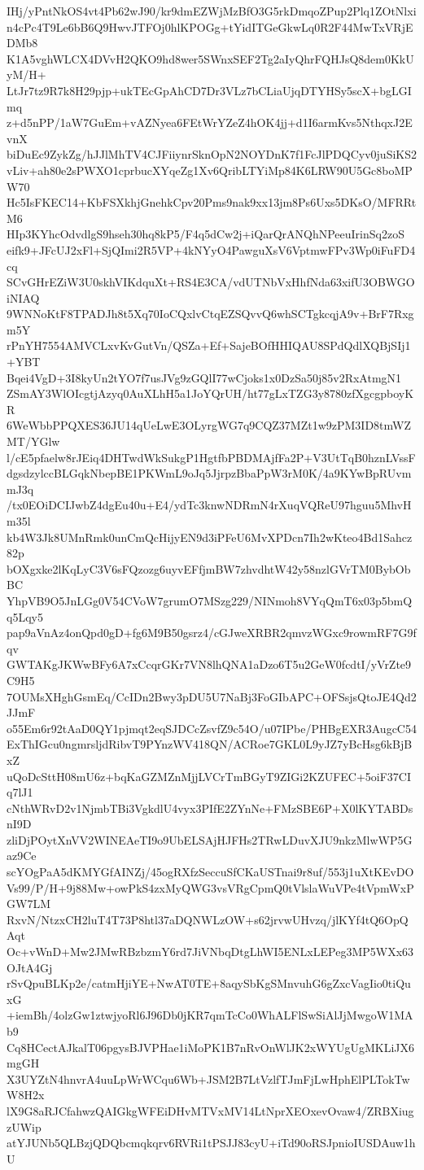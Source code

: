 IHj/yPntNkOS4vt4Pb62wJ90/kr9dmEZWjMzBfO3G5rkDmqoZPup2Plq1ZOtNlxi
n4cPc4T9Le6bB6Q9HwvJTFOj0hlKPOGg+tYidITGeGkwLq0R2F44MwTxVRjEDMb8
K1A5vghWLCX4DVvH2QKO9hd8wer5SWnxSEF2Tg2aIyQhrFQHJsQ8dem0KkUyM/H+
LtJr7tz9R7k8H29pjp+ukTEcGpAhCD7Dr3VLz7bCLiaUjqDTYHSy5scX+bgLGImq
z+d5nPP/1aW7GuEm+vAZNyea6FEtWrYZeZ4hOK4jj+d1I6armKvs5NthqxJ2EvnX
biDuEc9ZykZg/hJJlMhTV4CJFiiynrSknOpN2NOYDnK7f1FcJlPDQCyv0juSiKS2
vLiv+ah80e2sPWXO1cprbucXYqeZg1Xv6QribLTYiMp84K6LRW90U5Gc8boMPW70
Hc5IsFKEC14+KbFSXkhjGnehkCpv20Pms9nak9xx13jm8Ps6Uxs5DKsO/MFRRtM6
HIp3KYhcOdvdlgS9hseh30hq8kP5/F4q5dCw2j+iQarQrANQhNPeeuIrinSq2zoS
eifk9+JFcUJ2xFl+SjQImi2R5VP+4kNYyO4PawguXsV6VptmwFPv3Wp0iFuFD4cq
SCvGHrEZiW3U0skhVIKdquXt+RS4E3CA/vdUTNbVxHhfNda63xifU3OBWGOiNIAQ
9WNNoKtF8TPADJh8t5Xq70IoCQxlvCtqEZSQvvQ6whSCTgkcqjA9v+BrF7Rxgm5Y
rPnYH7554AMVCLxvKvGutVn/QSZa+Ef+SajeBOfHHIQAU8SPdQdlXQBjSIj1+YBT
Bqei4VgD+3I8kyUn2tYO7f7usJVg9zGQlI77wCjoks1x0DzSa50j85v2RxAtmgN1
ZSmAY3WlOIcgtjAzyq0AuXLhH5a1JoYQrUH/ht77gLxTZG3y8780zfXgcgpboyKR
6WeWbbPPQXES36JU14qUeLwE3OLyrgWG7q9CQZ37MZt1w9zPM3ID8tmWZMT/YGlw
l/cE5pfaelw8rJEiq4DHTwdWkSukgP1HgtfbPBDMAjfFa2P+V3UtTqB0hznLVssF
dgsdzylccBLGqkNbepBE1PKWmL9oJq5JjrpzBbaPpW3rM0K/4a9KYwBpRUvmmJ3q
/tx0EOiDCIJwbZ4dgEu40u+E4/ydTc3knwNDRmN4rXuqVQReU97hguu5MhvHm35l
kb4W3Jk8UMnRmk0unCmQcHijyEN9d3iPFeU6MvXPDcn7Ih2wKteo4Bd1Sahcz82p
bOXgxke2lKqLyC3V6sFQzozg6uyvEFfjmBW7zhvdhtW42y58nzlGVrTM0BybObBC
YhpVB9O5JnLGg0V54CVoW7grumO7MSzg229/NINmoh8VYqQmT6x03p5bmQq5Lqy5
pap9aVnAz4onQpd0gD+fg6M9B50gsrz4/cGJweXRBR2qmvzWGxc9rowmRF7G9fqv
GWTAKgJKWwBFy6A7xCcqrGKr7VN8lhQNA1aDzo6T5u2GeW0fcdtI/yVrZte9C9H5
7OUMsXHghGsmEq/CcIDn2Bwy3pDU5U7NaBj3FoGIbAPC+OFSsjsQtoJE4Qd2JJmF
o55Em6r92tAaD0QY1pjmqt2eqSJDCcZsvfZ9c54O/u07IPbe/PHBgEXR3AugcC54
ExThIGcu0ngmrsljdRibvT9PYnzWV418QN/ACRoe7GKL0L9yJZ7yBcHsg6kBjBxZ
uQoDcSttH08mU6z+bqKaGZMZnMjjLVCrTmBGyT9ZIGi2KZUFEC+5oiF37CIq7lJ1
cNthWRvD2v1NjmbTBi3VgkdlU4vyx3PIfE2ZYnNe+FMzSBE6P+X0lKYTABDsnI9D
zliDjPOytXnVV2WINEAeTI9o9UbELSAjHJFHs2TRwLDuvXJU9nkzMlwWP5Gaz9Ce
scYOgPaA5dKMYGfAINZj/45ogRXfzSeccuSfCKaUSTnai9r8uf/553j1uXtKEvDO
Vs99/P/H+9j88Mw+owPkS4zxMyQWG3vsVRgCpmQ0tVlslaWuVPe4tVpmWxPGW7LM
RxvN/NtzxCH2luT4T73P8htl37aDQNWLzOW+s62jrvwUHvzq/jlKYf4tQ6OpQAqt
Oc+vWnD+Mw2JMwRBzbzmY6rd7JiVNbqDtgLhWI5ENLxLEPeg3MP5WXx63OJtA4Gj
rSvQpuBLKp2e/catmHjiYE+NwAT0TE+8aqySbKgSMnvuhG6gZxcVagIio0tiQuxG
+iemBh/4olzGw1ztwjyoRl6J96Db0jKR7qmTcCo0WhALFlSwSiAlJjMwgoW1MAb9
Cq8HCectAJkalT06pgysBJVPHae1iMoPK1B7nRvOnWlJK2xWYUgUgMKLiJX6mgGH
X3UYZtN4hnvrA4uuLpWrWCqu6Wb+JSM2B7LtVzlfTJmFjLwHphElPLTokTwW8H2x
lX9G8aRJCfahwzQAIGkgWFEiDHvMTVxMV14LtNprXEOxevOvaw4/ZRBXiugzUWip
atYJUNb5QLBzjQDQbcmqkqrv6RVRi1tPSJJ83cyU+iTd90oRSJpnioIUSDAuw1hU
